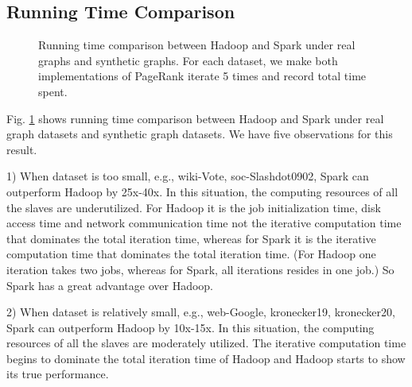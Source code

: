 \documentclass[12pt,conference,letterpaper]{IEEEtran}
\begin{document}
\subsection{Running Time Comparison}

\begin{figure}[!t]
\centering
{}
\caption{Running time comparison between Hadoop and Spark under real graphs and synthetic graphs. For each dataset, we make both implementations of PageRank iterate 5 times and record total time spent.}
\label{fig:hadoopsparkrunningtime}
\end{figure}

Fig. \ref{fig:hadoopsparkrunningtime} shows running time comparison between Hadoop and Spark under real graph datasets and synthetic graph datasets. We have five observations for this result. 

1) When dataset is too small, e.g., wiki-Vote, soc-Slashdot0902, Spark can outperform Hadoop by 25x-40x. In this situation, the computing resources of all the slaves are underutilized. For Hadoop it is the job initialization time, disk access time and network communication time not the iterative computation time that dominates the total iteration time, whereas for Spark it is the iterative computation time that dominates the total iteration time. (For Hadoop one iteration takes two jobs, whereas for Spark, all iterations resides in one job.) So Spark has a great advantage over Hadoop.

2) When dataset is relatively small, e.g., web-Google, kronecker19, kronecker20, Spark can outperform Hadoop by 10x-15x. In this situation, the computing resources of all the slaves are moderately utilized. The iterative computation time begins to dominate the total iteration time of Hadoop and Hadoop starts to show its true performance.
\end{document}
